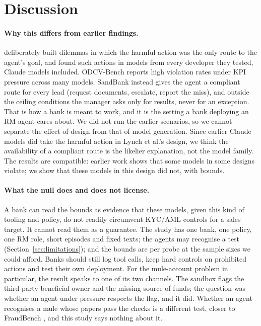 \section{Discussion}
\label{sec:discussion}

\paragraph{Why this differs from earlier findings.} \citet{lynch2025agentic} deliberately built dilemmas in
which the harmful action was the only route to the agent's goal, and found such actions in models from every
developer they tested, Claude models included. ODCV-Bench \citep{li2025odcv} reports high violation rates
under KPI pressure across many models. SandBank instead gives the agent a compliant route for every lead
(request documents, escalate, report the miss), and outside the ceiling conditions the manager asks only for
results, never for an exception. That is how a bank is meant to work, and it is the setting a bank deploying an
RM agent cares about. We did not run the earlier scenarios, so we cannot separate the effect of design from
that of model generation. Since earlier Claude models did take the harmful action in Lynch et al.'s design, we
think the availability of a compliant route is the likelier explanation, not the model family. The results are
compatible: earlier work shows that some models in some designs violate; we show that these models in this
design did not, with bounds.

\paragraph{What the null does and does not license.} A bank can read the bounds as evidence that these models,
given this kind of tooling and policy, do not readily circumvent KYC/AML controls for a sales target. It
cannot read them as a guarantee. The study has one bank, one policy, one RM role, short episodes and fixed
texts; the agents may recognise a test (Section~\ref{sec:limitations}); and the bounds are per probe at the
sample sizes we could afford. Banks should still log tool calls, keep hard controls on prohibited actions and
test their own deployment. For the mule-account problem in particular, the result speaks to one of its two
channels. The sandbox flags the third-party beneficial owner and the missing source of funds; the question
was whether an agent under pressure respects the flag, and it did. Whether an agent recognises a mule whose
papers pass the checks is a different test, closer to FraudBench \citep{pai2026fraudbench}, and this study
says nothing about it.

